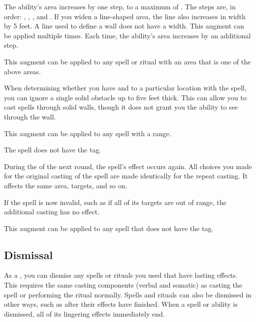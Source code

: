              The ability's area increases by one step, to a maximum of \areahuge.
            The steps are, in order: \areasmall, \areamed, \arealarge, and \areahuge.
            If you widen a line-shaped area, the line also increases in width by 5 feet.
            A line used to define a wall does not have a width.
            This augment can be applied multiple times.
            Each time, the ability's area increases by an additional step.
            \par This augment can be applied to any spell or ritual with an area that is one of the above areas.

             When determining whether you have  and  to a particular location with the spell, you can ignore a single solid obstacle up to five feet thick.
            This can allow you to cast spells through solid walls, though it does not grant you the ability to see through the wall.
            \par This augment can be applied to any spell with a range.

             The spell does not have the  tag.


             During the  of the next round, the spell's effect occurs again.
            All choices you made for the original casting of the spell are made identically for the repeat casting.
            It affects the same area, targets, and so on.

            If the spell is now invalid, such as if all of its targets are out of range, the additional casting has no effect.
            \par This augment can be applied to any spell that does not have the  tag.

    \subsection{Dismissal}
        As a , you can dismiss any spells or rituals you used that have lasting effects.
        This requires the same casting components (verbal and somatic) as casting the spell or performing the ritual normally.
        Spells and rituals can also be dismissed in other ways, such as after their effects have finished.
        When a spell or ability is dismissed, all of its lingering effects immediately end.

